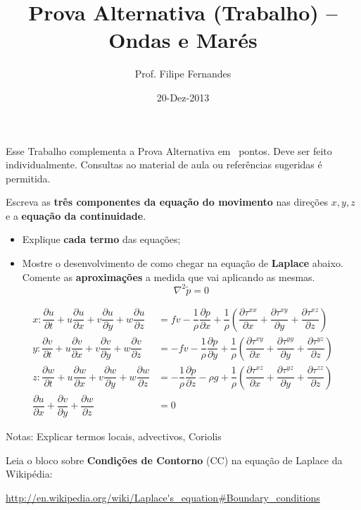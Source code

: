 \documentclass[letterpaper,portuguese,12pt,pdftex]{exam}
\title{Prova Alternativa (Trabalho) -- Ondas e Marés}
\author{Prof. Filipe Fernandes}
\date{20-Dez-2013}
\newcommand{\pd}[2]{\dfrac{\partial #1}{\partial #2}}
\begin{document}
\maketitle
\doublespacing

\begin{minipage}{.8\textwidth} %
Esse Trabalho complementa a Prova Alternativa em \numpoints\ pontos.  Deve ser feito
individualmente.  Consultas ao material de aula ou referências sugeridas é
permitida.
\vspace{1cm}
\end{minipage}


\begin{questions}
\question[2\half]
Escreva as {\bf três componentes da equação do movimento} nas direções
$x, y, z$ e a {\bf equação da continuidade}.

\begin{itemize}
  \item Explique {\bf cada termo} das equações;
  \item Mostre o desenvolvimento de como chegar na equação de {\bf Laplace}
        abaixo.  Comente as {\bf aproximações} a medida que vai aplicando as
        mesmas.
\[
  \nabla^2 \tilde{p}= 0
\]
\end{itemize}

\begin{solution}
\begin{align*}
x: \pd{u}{t} + u\pd{u}{x} + v\pd{u}{y} + w\pd{u}{z} &= fv - \dfrac{1}{\rho}\pd{p}{x} + \dfrac{1}{\rho}\left(\pd{\tau^{xx}}{x} + \pd{\tau^{xy}}{y} + \pd{\tau^{xz}}{z}\right) \\
y: \pd{v}{t} + u\pd{v}{x} + v\pd{v}{y} + w\pd{v}{z} &= -fv - \dfrac{1}{\rho}\pd{p}{y} + \dfrac{1}{\rho}\left(\pd{\tau^{xy}}{x} + \pd{\tau^{yy}}{y} + \pd{\tau^{yz}}{z}\right)  \\
z: \pd{w}{t} + u\pd{w}{x} + v\pd{w}{y} + w\pd{w}{z} &= - \dfrac{1}{\rho}\pd{p}{z} -\rho g + \dfrac{1}{\rho}\left(\pd{\tau^{xz}}{x} + \pd{\tau^{yz}}{y} + \pd{\tau^{zz}}{z}\right)  \\
\pd{u}{x} + \pd{v}{y} + \pd{w}{z} &= 0
\end{align*}

Notas: Explicar termos locais, advectivos, Coriolis
\end{solution}


\question[2\half]
Leia o bloco sobre {\bf Condições de Contorno} (CC) na equação de Laplace da
Wikipédia:

\url{http://en.wikipedia.org/wiki/Laplace's_equation#Boundary_conditions}


\end{questions}
\end{document}
